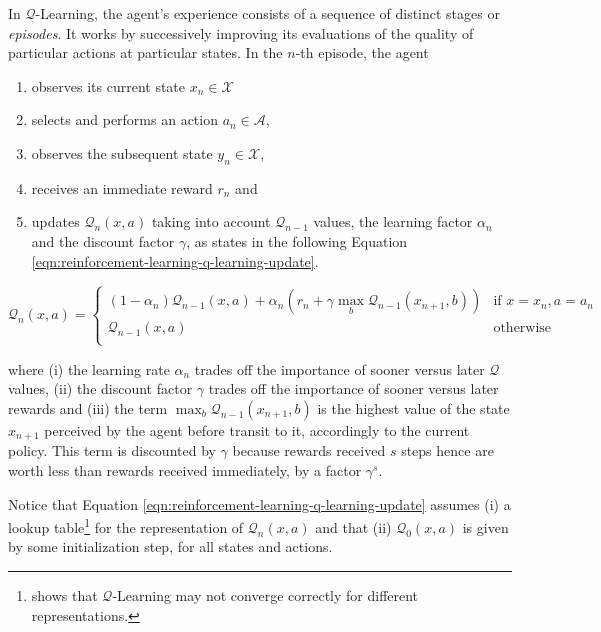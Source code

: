 In $\mathcal{Q}$-Learning, the agent's experience consists of a sequence of distinct stages or \textit{episodes}.
%
It works by successively improving its evaluations of the quality of particular actions at particular states.
%
In the $n$-th episode, the agent
\begin{enumerate}
	\item observes its current state $x_{n}\in\mathcal{X}$
	\item selects and performs an action $a_{n}\in\mathcal{A}$,
	\item observes the subsequent state $y_{n}\in\mathcal{X}$,
	\item receives an immediate reward $r_{n}$ and
	\item updates $\mathcal{Q}_{n}(x,a)$ taking into account $\mathcal{Q}_{n-1}$ values, the learning factor $\alpha_{n}$ and the discount factor $\gamma$, as states in the following Equation \ref{eqn:reinforcement-learning-q-learning-update}.
\end{enumerate}

\begin{equation}
\label{eqn:reinforcement-learning-q-learning-update}
\mathcal{Q}_{n}(x,a) = 
\begin{cases} 
(1-\alpha_{n})\mathcal{Q}_{n-1}(x,a) + \alpha_{n}(r_{n} + \gamma\max_{b} \mathcal{Q}_{n-1}(x_{n+1},b)) & \text{if } x=x_{n},a=a_{n} \\
\mathcal{Q}_{n-1}(x,a)       & \text{otherwise}           \\
\end{cases}
\end{equation}

where 
(i) the learning rate $\alpha_{n}$ trades off the importance of sooner versus later $\mathcal{Q}$ values,
(ii) the discount factor $\gamma$ trades off the importance of sooner versus later rewards and
(iii) the term $\max_{b} \mathcal{Q}_{n-1}(x_{n+1},b)$ is the highest value of the state $x_{n+1}$ perceived by the agent before transit to it, accordingly to the current policy. This term is discounted by $\gamma$ because rewards received $s$ steps hence are worth less than rewards received immediately, by a factor $\gamma^{s}$.

Notice that Equation \ref{eqn:reinforcement-learning-q-learning-update} assumes 
(i) a lookup table\footnote{\cite{watkins1989learning} shows that $\mathcal{Q}$-Learning may not converge correctly for different representations.} for the representation of $\mathcal{Q}_{n}(x,a)$ and that
(ii) $\mathcal{Q}_{0}(x,a)$ is given by some initialization step, for all states and actions.


